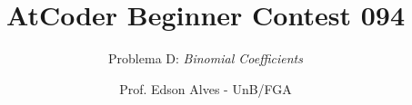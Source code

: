 \title{AtCoder Beginner Contest 094}
\subtitle{Problema D: {\it Binomial Coefficients}}
\author{Prof. Edson Alves - UnB/FGA}
\date{}
